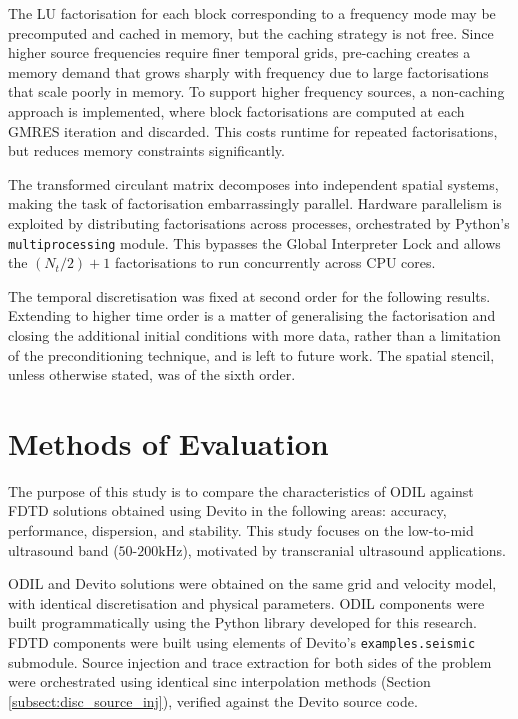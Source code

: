 \documentclass[final-report]{report-template}
\begin{document}
The LU factorisation for each block corresponding to a frequency mode may be precomputed and cached in memory, but the caching strategy is not free. Since higher source frequencies require finer temporal grids, pre-caching creates a memory demand that grows sharply with frequency due to large factorisations that scale poorly in memory. To support higher frequency sources, a non-caching approach is implemented, where block factorisations are computed at each GMRES iteration and discarded. This costs runtime for repeated factorisations, but reduces memory constraints significantly. 

The transformed circulant matrix decomposes into independent spatial systems, making the task of factorisation embarrassingly parallel. Hardware parallelism is exploited by distributing factorisations across processes, orchestrated by Python's \texttt{multiprocessing} module. This bypasses the Global Interpreter Lock and allows the $(N_t/2) + 1$ factorisations to run concurrently across CPU cores.

The temporal discretisation was fixed at second order for the following results. Extending to higher time order is a matter of generalising the factorisation and closing the additional initial conditions with more data, rather than a limitation of the preconditioning technique, and is left to future work. The spatial stencil, unless otherwise stated, was of the sixth order.

\newpage
\section{Methods of Evaluation}
The purpose of this study is to compare the characteristics of ODIL against FDTD solutions obtained using Devito \cite{louboutinDevitoV310Embedded2019} in the following areas: accuracy, performance, dispersion, and stability. This study focuses on the low-to-mid ultrasound band ($50$-$200 \si{\kilo\hertz}$), motivated by transcranial ultrasound applications.

ODIL and Devito solutions were obtained on the same grid and velocity model, with identical discretisation and physical parameters. ODIL components were built programmatically using the Python library developed for this research. FDTD components were built using elements of Devito's \texttt{examples.seismic} submodule. Source injection and trace extraction for both sides of the problem were orchestrated using identical sinc interpolation methods (Section \ref{subsect:disc_source_inj}), verified against the Devito source code. 
\end{document}
